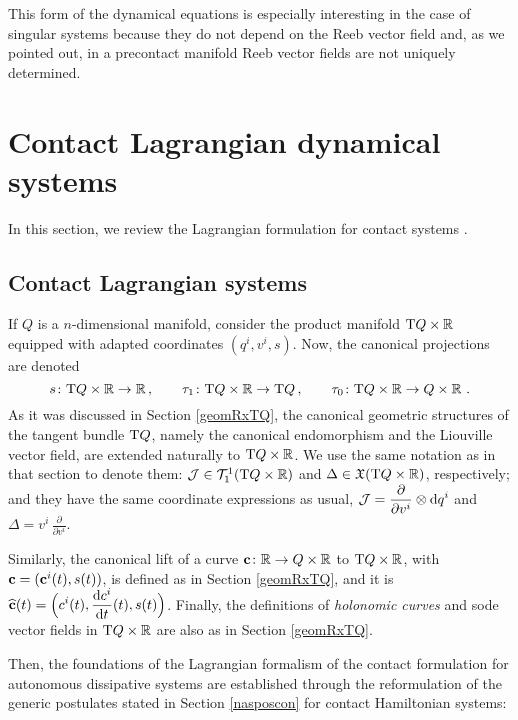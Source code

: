 \documentclass[12pt]{report}
\def\dst{\displaystyle}
\def\vf{\mathfrak X}
\def\d{{\rm d}}
\def\Real{\mathbb{R}}
\def\Tan{{\rm T}}
\begin{document}
This form of the dynamical equations is especially interesting in the case of singular systems because they do not depend on the Reeb vector field and, as we pointed out, 
in a precontact manifold Reeb vector fields are not uniquely determined.


\section{Contact Lagrangian dynamical systems}


In this section, we review the Lagrangian formulation for contact systems \cite{CIAGLIA2018,DeLeon2019,GGMRR-2019b}.


\subsection{Contact Lagrangian systems}
\label{sec-conLagsys}


If $Q$ is a $n$-dimensional manifold, consider the product manifold 
$\Tan Q\times\Real$ equipped with adapted coordinates $(q^i,v^i, s)$.
Now, the canonical projections are denoted
$$ 
s\colon \Tan Q\times\Real\to\Real \,, \qquad \tau_1\colon \Tan Q\times\Real\to\Tan Q\,, \qquad \tau_0\colon \Tan Q\times\Real\to Q\times\Real\ . 
$$
As it was discussed in Section \ref{geomRxTQ},
the canonical geometric structures of the tangent bundle $\Tan Q$, 
namely the canonical endomorphism and the Liouville vector field, 
are extended naturally to $\Tan Q\times\Real$.
We use the same notation as in that section
to denote them: ${\cal J}\in{\cal T}^1_1(\Tan Q\times\Real)$ and $\Delta\in\vf(\Tan Q\times\Real)$, respectively;
and they have the same coordinate expressions as usual,
$\dst{\cal J} = \frac{\partial}{\partial v^i}\otimes \d q^i$ and $\dst\Delta = v^i\, \frac{\partial}{\partial v^i}$.

Similarly, the canonical lift of a curve ${\bf c}\colon\Real \rightarrow Q\times\Real$ to $\Tan Q\times\Real$, 
with ${\bf c} = (\mathbf{c}^i(t),s(t))$,
is defined as in Section \ref{geomRxTQ}, and it is
$\dst{\bf\widehat c}(t)=\Big(c^i(t),\frac{\d c^i}{\d t}(t), s(t)\Big)$.
Finally, the definitions of {\sl holonomic curves} and {\sc sode} vector fields in $\Tan Q\times\Real$
are also as in Section \ref{geomRxTQ}.

Then, the foundations of the Lagrangian formalism of the contact formulation for autonomous dissipative systems
are established through the reformulation of the generic postulates stated in Section \ref{nasposcon} for contact Hamiltonian systems:
\end{document}
